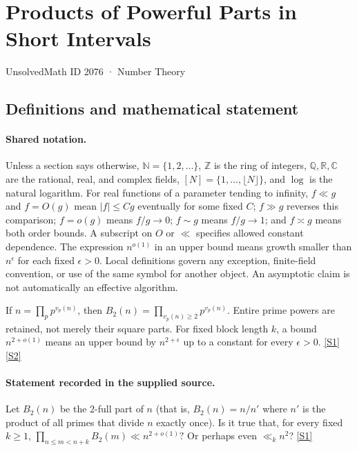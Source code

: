 \documentclass[11pt,a4paper]{article}
\newcommand{\N}{\mathbb{N}}
\newcommand{\Z}{\mathbb{Z}}
\newcommand{\Q}{\mathbb{Q}}
\newcommand{\R}{\mathbb{R}}
\newcommand{\C}{\mathbb{C}}
\newcommand{\sref}[2]{\hyperlink{source:#1:#2}{[S#2]}}
\begin{document}

\setcounter{section}{2075}

\section{Products of Powerful Parts in Short Intervals}\label{2076}

{\small\sffamily UnsolvedMath ID 2076 · Number Theory}

\subsection{Definitions and mathematical statement}

\paragraph{Shared notation.}Unless a section says otherwise, $\N=\{1,2,\ldots\}$,
$\Z$ is the ring of integers, $\Q,\R,\C$ are the rational, real, and complex
fields, $[N]=\{1,\ldots,\lfloor N\rfloor\}$, and $\log$ is the natural
logarithm. For real functions of a parameter tending to infinity,
$f\ll g$ and $f=O(g)$ mean $|f|\leq Cg$ eventually for some fixed $C$;
$f\gg g$ reverses this comparison; $f=o(g)$ means $f/g\to0$;
$f\sim g$ means $f/g\to1$; and $f\asymp g$ means both order bounds.
A subscript on $O$ or $\ll$ specifies allowed constant dependence.
The expression $n^{o(1)}$ in an upper bound means growth smaller than
$n^\epsilon$ for each fixed $\epsilon>0$. Local definitions govern any
exception, finite-field convention, or use of the same symbol for another
object. An asymptotic claim is not automatically an effective algorithm.



If $n=\prod_pp^{v_p(n)}$, then $B_2(n)=\prod_{v_p(n)\geq2}p^{v_p(n)}$. Entire prime powers are retained, not merely their square parts. For fixed block length $k$, a bound $n^{2+o(1)}$ means an upper bound by $n^{2+\epsilon}$ up to a constant for every $\epsilon>0$. \sref{2076}{1} \sref{2076}{2}

\paragraph{Statement recorded in the supplied source.}
Let $B_2(n)$ be the 2-full part of $n$ (that is, $B_2(n)=n/n'$ where $n'$ is the product of all primes that divide $n$ exactly once). Is it true that, for every fixed $k\geq 1$, $ \prod_{n\leq m<n+k}B_2(m) \ll n^{2+o(1)}? $ Or perhaps even $\ll_k n^2$? \sref{2076}{1}
\end{document}
